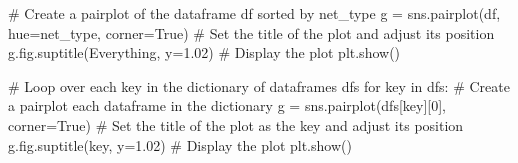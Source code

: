 \documentclass[
  letterpaper,
  DIV=11,
  numbers=noendperiod,
  oneside]{scrartcl}
\newenvironment{Shaded}{\begin{snugshade}}{\end{snugshade}}
\newcommand{\CommentTok}[1]{\textcolor[rgb]{0.37,0.37,0.37}{#1}}
\newcommand{\ControlFlowTok}[1]{\textcolor[rgb]{0.00,0.23,0.31}{#1}}
\newcommand{\DecValTok}[1]{\textcolor[rgb]{0.68,0.00,0.00}{#1}}
\newcommand{\FloatTok}[1]{\textcolor[rgb]{0.68,0.00,0.00}{#1}}
\newcommand{\KeywordTok}[1]{\textcolor[rgb]{0.00,0.23,0.31}{#1}}
\newcommand{\NormalTok}[1]{\textcolor[rgb]{0.00,0.23,0.31}{#1}}
\newcommand{\OperatorTok}[1]{\textcolor[rgb]{0.37,0.37,0.37}{#1}}
\newcommand{\StringTok}[1]{\textcolor[rgb]{0.13,0.47,0.30}{#1}}
\newcommand{\VariableTok}[1]{\textcolor[rgb]{0.07,0.07,0.07}{#1}}
\begin{document}
\begin{Shaded}
\begin{Highlighting}[]
\CommentTok{\# Create a pairplot of the dataframe \textquotesingle{}df\textquotesingle{} sorted by \textquotesingle{}net\_type\textquotesingle{}}
\NormalTok{g }\OperatorTok{=}\NormalTok{ sns.pairplot(df, hue}\OperatorTok{=}\StringTok{\textquotesingle{}net\_type\textquotesingle{}}\NormalTok{, corner}\OperatorTok{=}\VariableTok{True}\NormalTok{)}
\CommentTok{\# Set the title of the plot and adjust its position}
\NormalTok{g.fig.suptitle(}\StringTok{\textquotesingle{}Everything\textquotesingle{}}\NormalTok{, y}\OperatorTok{=}\FloatTok{1.02}\NormalTok{)}
\CommentTok{\# Display the plot}
\NormalTok{plt.show()}

\CommentTok{\# Loop over each key in the dictionary of dataframes \textquotesingle{}dfs\textquotesingle{}}
\ControlFlowTok{for}\NormalTok{ key }\KeywordTok{in}\NormalTok{ dfs:}
    \CommentTok{\# Create a pairplot each dataframe in the dictionary}
\NormalTok{    g }\OperatorTok{=}\NormalTok{ sns.pairplot(dfs[key][}\DecValTok{0}\NormalTok{], corner}\OperatorTok{=}\VariableTok{True}\NormalTok{)}
    \CommentTok{\# Set the title of the plot as the key and adjust its position}
\NormalTok{    g.fig.suptitle(key, y}\OperatorTok{=}\FloatTok{1.02}\NormalTok{)}
    \CommentTok{\# Display the plot}
\NormalTok{    plt.show()}
\end{Highlighting}
\end{Shaded}
\end{document}
